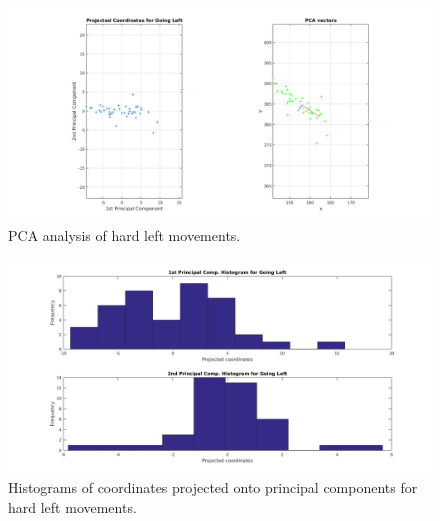 \documentclass[paper=a4, fontsize=11pt]{scrartcl} %
\begin{document}
    \begin{figure}[h!]
        \begin{center}
            \setlength{\fboxsep}{0.5pt} %
            \setlength{\fboxrule}{0.5pt}
            \includegraphics[width=\linewidth,fbox]{images/pca_Left.png}
            \caption{PCA analysis of hard left movements.}
        \end{center}
    \end{figure}
    
    \begin{figure}[h!]
        \begin{center}
            \setlength{\fboxsep}{0.5pt} %
            \setlength{\fboxrule}{0.5pt}
            \includegraphics[width=\linewidth,fbox]{images/pca_histogram_Left.png}
            \caption{Histograms of coordinates projected onto principal components for hard left movements.}
        \end{center}
    \end{figure}

    \newpage
\end{document}
